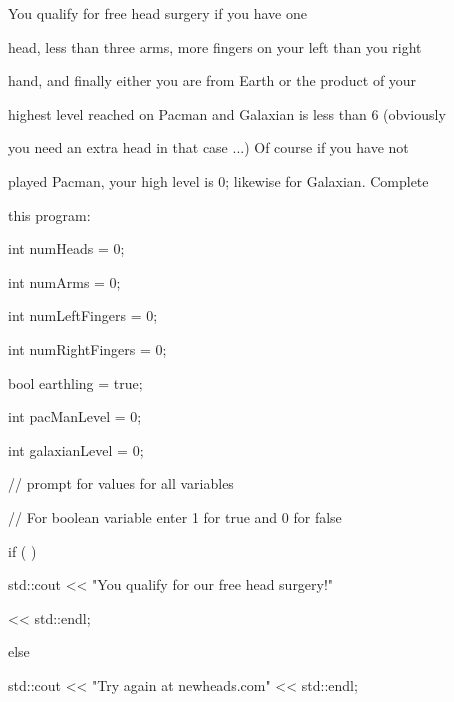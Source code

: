 You qualify for free head surgery if you have one

head, less than three arms, more fingers on your left than you right

hand, and finally either you are from Earth or the product of your

highest level reached on Pacman and Galaxian is less than 6 (obviously

you need an extra head in that case ...) Of course if you have not

played Pacman, your high level is 0; likewise for Galaxian. Complete

this program:

\begin{console}

int numHeads = 0;

int numArms = 0;

int numLeftFingers = 0;

int numRightFingers = 0;

bool earthling = true;

int pacManLevel = 0;

int galaxianLevel = 0;



// prompt for values for all variables

// For boolean variable enter 1 for true and 0 for false



if (                             )

std::cout << "You qualify for our free head surgery!"

          << std::endl;

else

std::cout << "Try again at newheads.com" << std::endl;

\end{console}


